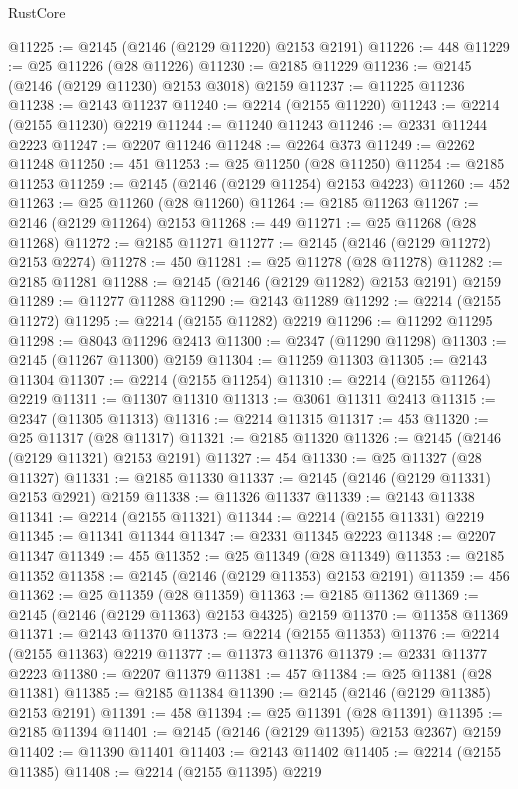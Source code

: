 \begin{lexlean}{RustCore}
\begin{coremodule}
@11225 := @2145 (@2146 (@2129 @11220) @2153 @2191)
@11226 := 448
@11229 := @25 @11226 (@28 @11226)
@11230 := @2185 @11229
@11236 := @2145 (@2146 (@2129 @11230) @2153 @3018) @2159
@11237 := @11225 @11236
@11238 := @2143 @11237
@11240 := @2214 (@2155 @11220)
@11243 := @2214 (@2155 @11230) @2219
@11244 := @11240 @11243
@11246 := @2331 @11244 @2223
@11247 := @2207 @11246
@11248 := @2264 @373
@11249 := @2262 @11248
@11250 := 451
@11253 := @25 @11250 (@28 @11250)
@11254 := @2185 @11253
@11259 := @2145 (@2146 (@2129 @11254) @2153 @4223)
@11260 := 452
@11263 := @25 @11260 (@28 @11260)
@11264 := @2185 @11263
@11267 := @2146 (@2129 @11264) @2153
@11268 := 449
@11271 := @25 @11268 (@28 @11268)
@11272 := @2185 @11271
@11277 := @2145 (@2146 (@2129 @11272) @2153 @2274)
@11278 := 450
@11281 := @25 @11278 (@28 @11278)
@11282 := @2185 @11281
@11288 := @2145 (@2146 (@2129 @11282) @2153 @2191) @2159
@11289 := @11277 @11288
@11290 := @2143 @11289
@11292 := @2214 (@2155 @11272)
@11295 := @2214 (@2155 @11282) @2219
@11296 := @11292 @11295
@11298 := @8043 @11296 @2413
@11300 := @2347 (@11290 @11298)
@11303 := @2145 (@11267 @11300) @2159
@11304 := @11259 @11303
@11305 := @2143 @11304
@11307 := @2214 (@2155 @11254)
@11310 := @2214 (@2155 @11264) @2219
@11311 := @11307 @11310
@11313 := @3061 @11311 @2413
@11315 := @2347 (@11305 @11313)
@11316 := @2214 @11315
@11317 := 453
@11320 := @25 @11317 (@28 @11317)
@11321 := @2185 @11320
@11326 := @2145 (@2146 (@2129 @11321) @2153 @2191)
@11327 := 454
@11330 := @25 @11327 (@28 @11327)
@11331 := @2185 @11330
@11337 := @2145 (@2146 (@2129 @11331) @2153 @2921) @2159
@11338 := @11326 @11337
@11339 := @2143 @11338
@11341 := @2214 (@2155 @11321)
@11344 := @2214 (@2155 @11331) @2219
@11345 := @11341 @11344
@11347 := @2331 @11345 @2223
@11348 := @2207 @11347
@11349 := 455
@11352 := @25 @11349 (@28 @11349)
@11353 := @2185 @11352
@11358 := @2145 (@2146 (@2129 @11353) @2153 @2191)
@11359 := 456
@11362 := @25 @11359 (@28 @11359)
@11363 := @2185 @11362
@11369 := @2145 (@2146 (@2129 @11363) @2153 @4325) @2159
@11370 := @11358 @11369
@11371 := @2143 @11370
@11373 := @2214 (@2155 @11353)
@11376 := @2214 (@2155 @11363) @2219
@11377 := @11373 @11376
@11379 := @2331 @11377 @2223
@11380 := @2207 @11379
@11381 := 457
@11384 := @25 @11381 (@28 @11381)
@11385 := @2185 @11384
@11390 := @2145 (@2146 (@2129 @11385) @2153 @2191)
@11391 := 458
@11394 := @25 @11391 (@28 @11391)
@11395 := @2185 @11394
@11401 := @2145 (@2146 (@2129 @11395) @2153 @2367) @2159
@11402 := @11390 @11401
@11403 := @2143 @11402
@11405 := @2214 (@2155 @11385)
@11408 := @2214 (@2155 @11395) @2219

\end{coremodule}
\end{lexlean}
